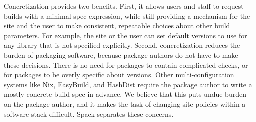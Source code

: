 Concretization provides two benefits.  First, it allows users and staff to
request builds with a minimal spec expression, while still providing a
mechanism for the site and the user to make consistent, repeatable choices about
other build parameters.  For example, the site or the user can set default versions
to use for any library that is not specified explicitly.
%
Second, concretization reduces the burden of packaging software, because
package authors do not have to make these decisions.  There is no
need for packages to contain complicated checks, or for packages to be overly
specific about versions.  Other multi-configuration systems like Nix, EasyBuild,
and HashDist require the package author to write a mostly concrete build spec in advance.
We believe that this puts undue burden on the package author, and it makes the task
of changing site policies within a software stack difficult.  Spack
separates these concerns.
